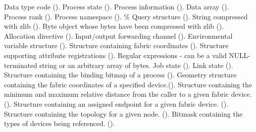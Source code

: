 \begin{constantdesc}
%
Data type code ().
%
Process state ().
%
Process information ().
%
Data array ().
%
Process rank ().
%
Process namespace ().
\%
Query structure ().
%
String compressed with zlib ().
%
Byte object whose bytes have been compressed with zlib ().
%
Allocation directive ().
%
Input/output forwarding channel ().
%
Environmental variable structure ().
%
Structure containing fabric coordinates ().
%
Structure supporting attribute registrations ().
%
Regular expressions - can be a valid NULL-terminated string or an arbitrary array of bytes.
%
Job state ().
%
Link state ().
%
Structure containing the binding bitmap of a process ().
%
Geometry structure containing the fabric coordinates of a specified device.().
%
Structure containing the minimum and maximum relative distance from the caller to a given fabric device. ().
%
Structure containing an assigned endpoint for a given fabric device. ().
%
Structure containing the topology for a given node. ().
%
Bitmask containing the types of devices being referenced. ().

\end{constantdesc}

